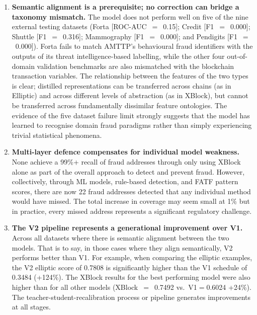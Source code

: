 \documentclass[journal]{IEEEtran}
\begin{document}
\begin{enumerate}
\item \textbf{Semantic alignment is a prerequisite; no correction can bridge a taxonomy mismatch.} The model does not perform well on five of the nine external testing datasets (Forta [ROC-AUC~$=$~0.15]; Credit [F1~$=$~0.000]; Shuttle [F1~$=$~0.316]; Mammography [F1~$=$~0.000]; and Pendigits [F1~$=$~0.000]). Forta fails to match AMTTP's behavioural fraud identifiers with the outputs of its threat intelligence-based labelling, while the other four out-of-domain validation benchmarks are also mismatched with the blockchain transaction variables. The relationship between the features of the two types is clear; distilled representations can be transferred across chains (as in Elliptic) and across different levels of abstraction (as in XBlock), but cannot be transferred across fundamentally dissimilar feature ontologies. The evidence of the five dataset failure limit strongly suggests that the model has learned to recognise domain fraud paradigms rather than simply experiencing trivial statistical phenomena.

\item \textbf{Multi-layer defence compensates for individual model weakness.} None achieve a 99\%+ recall of fraud addresses through only using XBlock alone as part of the overall approach to detect and prevent fraud. However, collectively, through ML models, rule-based detection, and FATF pattern scores, there are now 22 fraud addresses detected that any individual method would have missed. The total increase in coverage may seem small at 1\% but in practice, every missed address represents a significant regulatory challenge.

\item \textbf{The V2 pipeline represents a generational improvement over V1.} Across all datasets where there is semantic alignment between the two models. That is to say, in those cases where they align semantically, V2 performs better than V1. For example, when comparing the elliptic examples, the V2 elliptic score of 0.7808 is significantly higher than the V1 schedule of 0.3484 (+124\%). The XBlock results for the best performing model were also higher than for all other models (XBlock~$=$~0.7492 vs.\ V1$=$0.6024 +24\%). The teacher-student-recalibration process or pipeline generates improvements at all stages.


\end{enumerate}
\end{document}
